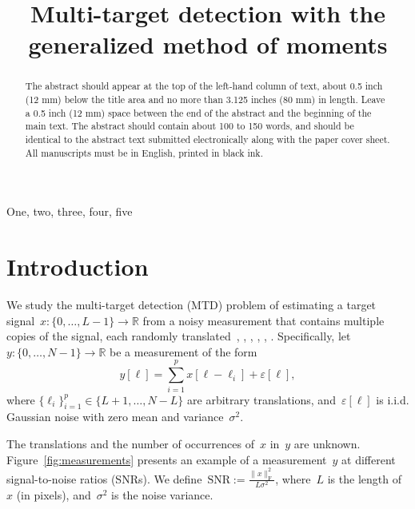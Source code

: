 \documentclass{article}
\title{Multi-target detection with the generalized method of moments}
\begin{document}
%
\maketitle
%
\begin{abstract}
The abstract should appear at the top of the left-hand column of text, about
0.5 inch (12 mm) below the title area and no more than 3.125 inches (80 mm) in
length.  Leave a 0.5 inch (12 mm) space between the end of the abstract and the
beginning of the main text.  The abstract should contain about 100 to 150
words, and should be identical to the abstract text submitted electronically
along with the paper cover sheet.  All manuscripts must be in English, printed
in black ink.
\end{abstract}
%
\begin{keywords}
One, two, three, four, five
\end{keywords}
%
\section{Introduction}
\label{sec:intro}

We study the multi-target detection (MTD) problem of estimating a target signal~\mbox{$x: \{0, \ldots, L-1\} \rightarrow \mathbb{R}$} from a noisy measurement that contains multiple copies of the signal, each randomly translated~\cite{bendory2019multi}, \cite{lan2020multi}, \cite{marshall2020image}, \cite{bendory2021multi}, \cite{kreymer2021two}, \cite{bendory2018toward}. Specifically, let~\mbox{$y: \{0, \ldots, N-1\} \rightarrow \mathbb{R}$} be a measurement of the form
\begin{equation}
\label{eq:model}
y[\ell] = \sum_{i=1}^{p} x[\ell - \ell_i] + \varepsilon[\ell],
\end{equation}
where \mbox{$\{\ell_i\}_{i=1}^{p} \in \{L + 1, \ldots, N-L\}$} are arbitrary translations, and~$\varepsilon[\ell]$ is i.i.d. Gaussian noise with zero mean and \mbox{variance~$\sigma^2$}.

The translations and the number of occurrences of~$x$ in~$y$ are unknown. Figure~\ref{fig:measurements} presents an example of a measurement~$y$ at different signal-to-noise ratios (SNRs). We define~\mbox{$\text{SNR} := \frac{\|x\|_\text{F}^2}{L \sigma^2}$}, where~$L$ is the length of~$x$ (in pixels), and~$\sigma^2$ is the noise variance.
\end{document}
